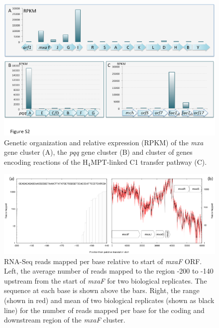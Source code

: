 \begin{figure}[H]
\centering
     \includegraphics[width=1.0\textwidth]{./tex/chapter1/figures/supplemental/FigureS2.png}
     \begin{singlespace}
     \caption[Genetic organization and relative expression (RPKM) of the \textit{mxa} gene cluster]{
        Genetic organization and relative expression (RPKM) of the \textit{mxa} gene cluster (A), the \textit{pqq} gene cluster (B) and cluster of genes encoding reactions of the H$_4$MPT-linked C1 transfer pathway (C).}
     \label{fig:S2} %
     \end{singlespace}
\end{figure}

\begin{figure}[H]
\centering
     \includegraphics[width=1.0\textwidth]{./tex/chapter1/figures/supplemental/FigureS3.png}
     \begin{singlespace}
     \caption[RNA-Seq reads mapped per base relative to start of \textit{mxaF} ORF]{
        RNA-Seq reads mapped per base relative to start of \textit{mxaF} ORF.
        Left, the average number of reads mapped to the region -200 to -140 upstream from the start of \textit{mxaF} for two biological replicates.
        The sequence at each base is shown above the bars.
        Right, the range (shown in red) and mean of two biological replicates (shown as black line) for the number of reads mapped per base for the coding and downstream region of the \textit{mxaF} cluster.
        }
     \label{fig:S3} %
     \end{singlespace}
\end{figure}

